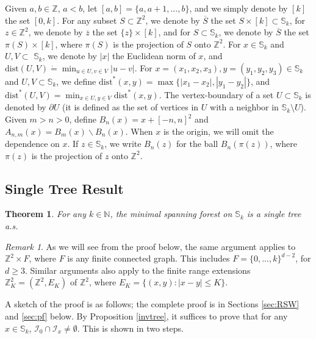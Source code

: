 \documentclass[12pt, twoside,a4paper,reqno]{amsart}
\theoremstyle{plain}
\newtheorem{theorem}{Theorem}[section]
\theoremstyle{remark}
\newtheorem*{remark}{Remark}
\theoremstyle{definition}
\renewcommand{\bar}{\overline}
\begin{document}
Given $a,b\in \mathbb{Z}$, $a<b$, let $[ a,b] =\{
  a,a+1,...,b\} $, and we simply denote by $[k]$ the set $[
  0,k] $. For any subset $S\subset \mathbb{Z}^{2}$, we denote by
$\bar{S}$ the set $S\times [ k] \subset \mathbb{S}_{k}$, for $z \in
\mathbb{Z}^{2}$, we denote by $\bar{z}$ the set $\{z\}\times [k]$, and for
$S\subset \mathbb S_k$, we denote by $\bar S$ the set $\pi(S)\times[k]$, where
$\pi(S)$ is the projection of $S$ onto $\mathbb Z^2$. For $x\in \mathbb{S}_{k}$
and $U,V\subset $ $\mathbb{S}_{k}$, we denote by $\vert x\vert $ the
Euclidean norm of $x$, and $\mathrm{dist}( U,V) \dot{=}\min_{u\in U,v\in
  V}\vert u-v\vert $. For $x=(x_{1}, x_{2}, x_{3}), y=(y_{1}, y_{2},
y_{3}) \in \mathbb S_k$ and $U,V\subset \mathbb{S}_{k}$, we define
$\mathrm{dist}^{*}(x,y) =\max \{|x_{1}-x_{2}|, |y_{1}-y_{2}|\}$, and $\mathrm{dist}^{*}(U,V)
=\min_{x \in U, y\in V} \text{dist}^{*}(x,y)$. The vertex-boundary of a set
$U\subset \mathbb S_k$ is denoted by $\partial U$ (it is defined as the set of
vertices in $U$ with a neighbor in $\mathbb S_k\setminus U$). Given $%
m>n>0$, define $B_{n}(x) =x+ [ -n,n] ^{2}$ and $%
A_{n,m}( x) =B_{m}( x) \backslash B_{n}( x) $.
When $x$ is the origin, we will omit the dependence on $x$. If $z\in \mathbb
S_k$, we write $B_n(z)$ for the ball $B_n(\pi(z))$, where $\pi(z)$ is the projection of $z$
onto $\mathbb Z^2$.

\subsection{Single Tree Result}




\begin{theorem}
\label{MSF}For any $k\in \mathbb{N}$, the minimal spanning forest on $%
\mathbb{S}_{k}$ is a single tree a.s.
\end{theorem}

\begin{remark}
As we will see from the proof below, the same argument applies to
$\mathbb{Z}^{2}\times F$, where $F$ is any finite connected graph. This includes $F=\{
0,...,k\} ^{d-2}$, for $d\geq 3$. Similar arguments also apply to the finite range extensions
$\mathbb{Z}^{2}_{K} = (\mathbb{Z}^{2}, E_{K})$ of $\mathbb{Z}^{2}$, where $E_{K}= \{(x,y):|x-y|\leq K\} $.
\end{remark}

A sketch of the proof is as follows; the complete proof is in Sections \ref{sec:RSW} and \ref{sec:pf} below. By Proposition \ref{invtree}, it suffices to prove that for any $x\in \mathbb{S}%
_{k}$, $\mathcal{I}_{0}\cap \mathcal{I}_{x}\neq \emptyset $. This is shown in two steps.
\end{document}
